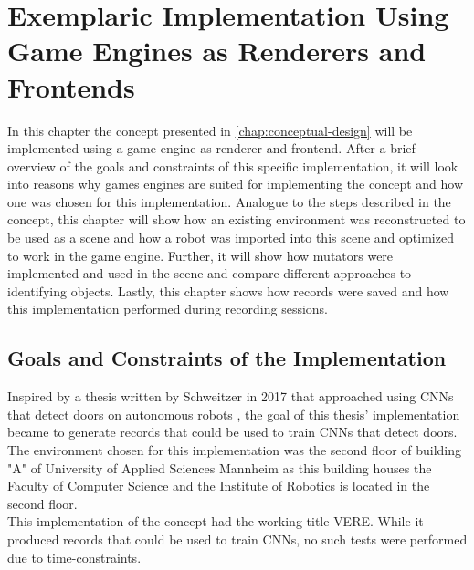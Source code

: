 \chapter{Exemplaric Implementation Using Game Engines as Renderers and Frontends}
\label{chap:implementations}
In this chapter the concept presented in \ref{chap:conceptual-design} will be implemented using a game engine as renderer and frontend. After a brief overview of the goals and constraints of this specific implementation, it will look into reasons why games engines are suited for implementing the concept and how one was chosen for this implementation. Analogue to the steps described in the concept, this chapter will show how an existing environment was reconstructed to be used as a scene and how a robot was imported into this scene and optimized to work in the game engine. Further, it will show how mutators were implemented and used in the scene and compare different approaches to identifying objects. Lastly, this chapter shows how records were saved and how this implementation performed during recording sessions.

\section{Goals and Constraints of the Implementation}
\label{section:goals-and-constraints}
Inspired by a thesis written by Schweitzer in 2017 that approached using \acsp{CNN} that detect doors on autonomous robots \cite{Schweitzer2017}, the goal of this thesis' implementation became to generate records that could be used to train \acsp{CNN} that detect doors.\\ 
The environment chosen for this implementation was the second floor of building "A" of University of Applied Sciences Mannheim as this building houses the Faculty of Computer Science and the Institute of Robotics is located in the second floor.\\
This implementation of the concept had the working title \ac{VERE}. While it produced records that could be used to train \acsp{CNN}, no such tests were performed due to time-constraints.


